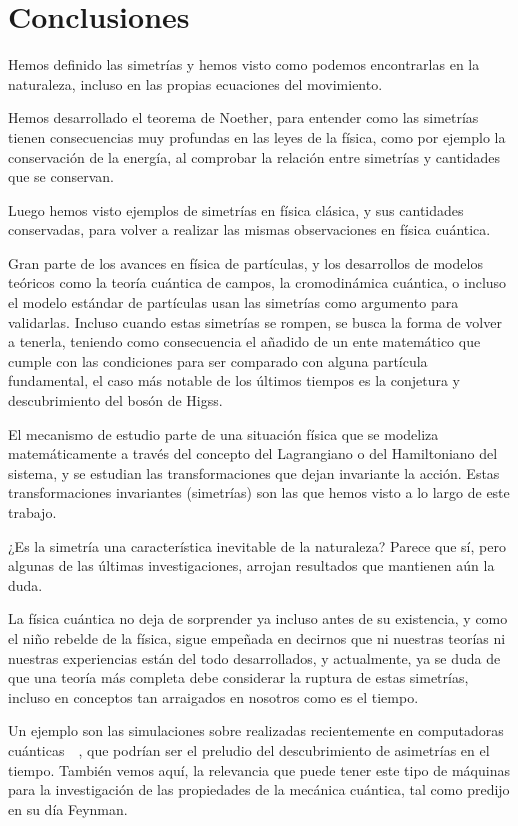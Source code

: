 \section{Conclusiones}\label{ch:conclusiones}
Hemos definido las simetrías y hemos visto como podemos encontrarlas en la naturaleza, incluso en las propias ecuaciones del movimiento.

Hemos desarrollado el teorema de Noether, para entender como las simetrías tienen consecuencias muy profundas en las leyes de la física, como por ejemplo la conservación de la energía, al comprobar la relación entre simetrías y cantidades que se conservan.

Luego hemos visto ejemplos de simetrías en física clásica, y sus cantidades conservadas, para volver a realizar las mismas observaciones en física cuántica.

Gran parte de los avances en física de partículas, y los desarrollos de modelos teóricos como la teoría cuántica de campos, la cromodinámica cuántica, o incluso el modelo estándar de partículas usan las simetrías como argumento para validarlas.
Incluso cuando estas simetrías se rompen, se busca la forma de volver a tenerla, teniendo como consecuencia el añadido de un ente matemático que cumple con las condiciones para ser comparado con alguna partícula fundamental, el caso más notable de los últimos tiempos es la conjetura y descubrimiento del bosón de Higss.

El mecanismo de estudio parte de una situación física que se modeliza matemáticamente a través del concepto del Lagrangiano o del Hamiltoniano del sistema, y se estudian las transformaciones que dejan invariante la acción.
Estas transformaciones invariantes (simetrías) son las que hemos visto a lo largo de este trabajo.

¿Es la simetría una característica inevitable de la naturaleza?
Parece que sí, pero algunas de las últimas investigaciones, arrojan resultados que mantienen aún la duda.

La física cuántica no deja de sorprender ya incluso antes de su existencia, y como el niño rebelde de la física, sigue empeñada en decirnos que ni nuestras teorías ni nuestras experiencias están del todo desarrollados, y actualmente, ya se duda de que una teoría más completa debe considerar la ruptura de estas simetrías, incluso en conceptos tan arraigados en nosotros como es el tiempo.

Un ejemplo son las simulaciones sobre  realizadas recientemente en computadoras cuánticas~\cite{TC1}~\cite{TC2}, que podrían ser el preludio del descubrimiento de asimetrías en el tiempo. También vemos aquí, la relevancia que puede tener este tipo de máquinas para la investigación de las propiedades de la mecánica cuántica, tal como predijo en su día Feynman.

